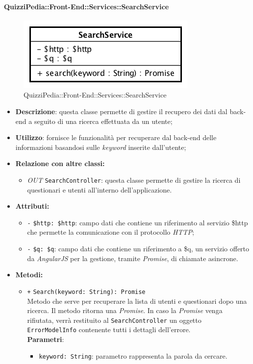 \paragraph{QuizziPedia::Front-End::Services::SearchService}
\begin{figure}[ht]
	\centering
	\includegraphics[scale=0.60]{UML/Classi/Front-End/QuizziPedia_Front-end_Services_SearchService.png}
	\caption{QuizziPedia::Front-End::Services::SearchService}
\end{figure}\FloatBarrier
\begin{itemize}
	\item \textbf{Descrizione}: questa classe permette di gestire il recupero dei dati dal back-end a seguito di una ricerca effettuata da un utente;
	\item \textbf{Utilizzo}: fornisce le funzionalità per recuperare dal back-end delle informazioni basandosi sulle \textit{keyword} inserite dall'utente;
	\item \textbf{Relazione con altre classi:}
	\begin{itemize}
		\item \textit{OUT} \texttt{SearchController}: questa classe permette di gestire la ricerca di questionari e utenti all'interno dell'applicazione.
	\end{itemize}
	\item \textbf{Attributi:}
	\begin{itemize}
		\item \texttt{-} \texttt{\$http: \$http}: campo dati che contiene un riferimento al servizio \$http che permette la comunicazione con il protocollo \textit{HTTP};
		\item \texttt{-} \texttt{\$q: \$q}: campo dati che contiene un riferimento a \$q, un servizio offerto da \textit{AngularJS} per la gestione, tramite \textit{Promise}, di chiamate asincrone. 
	\end{itemize}
	\item \textbf{Metodi:}
	\begin{itemize}
		\item \texttt{+} \texttt{Search(keyword: String): Promise} \\Metodo che serve per recuperare la lista di utenti e questionari dopo una ricerca. Il metodo ritorna una \textit{Promise}. In caso la \textit{Promise} venga rifiutata, verrà restituito al \texttt{SearchController} un oggetto \texttt{ErrorModelInfo} contenente tutti i dettagli dell'errore. \\
		\textbf{Parametri}:
		\begin{itemize}
			\item \texttt{keyword: String}: parametro rappresenta la parola da cercare.
		\end{itemize}
	\end{itemize}
\end{itemize}

